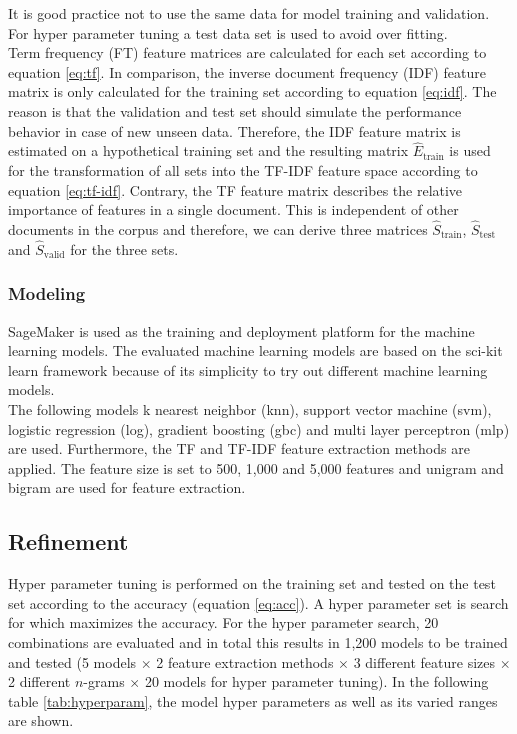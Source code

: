 \documentclass[a4paper,12pt,nottoc]{article}
\begin{document}
\noindent It is good practice not to use the same data for model training and validation. For hyper parameter tuning a test data set is used to avoid over fitting.\\

\noindent Term frequency (FT) feature matrices are calculated for each set according to equation \ref{eq:tf}. In comparison, the inverse document frequency (IDF) feature matrix is only calculated for the training set according to equation \ref{eq:idf}. The reason is that the validation and test set should simulate the performance behavior in case of new unseen data. Therefore, the IDF feature matrix is estimated on a hypothetical training set and the resulting matrix $\hat{E}_{\textrm{train}}$ is used for the transformation of all sets into the TF-IDF feature space according to equation \ref{eq:tf-idf}. Contrary, the TF feature matrix describes the relative importance of features in a single document. This is independent of other documents in the corpus and therefore, we can derive three matrices $\hat{S}_{\textrm{train}}$, $\hat{S}_{\textrm{test}}$ and $\hat{S}_{\textrm{valid}}$ for the three sets.

\subsubsection{Modeling}

\noindent SageMaker \cite{bib:sagemaker} is used as the training and deployment platform for the machine learning models. The evaluated machine learning models are based on the sci-kit learn framework \cite{bib:scikit-learn} because of its simplicity to try out different machine learning models.\\

\noindent The following models k nearest neighbor (knn), support vector machine (svm), logistic regression (log), gradient boosting (gbc) and multi layer perceptron (mlp) are used. Furthermore, the TF and TF-IDF feature extraction methods are applied. The feature size is set to 500, 1,000 and 5,000 features and unigram and bigram are used for feature extraction.

\subsection{Refinement}

Hyper parameter tuning is performed on the training set and tested on the test set according to the accuracy (equation \ref{eq:acc}). A hyper parameter set is search for which maximizes the accuracy. For the hyper parameter search, 20 combinations are evaluated and in total this results in 1,200 models to be trained and tested (5 models $\times$ 2 feature extraction methods $\times$  3 different feature sizes $\times$ 2 different $n$-grams $\times$ 20 models for hyper parameter tuning). In the following table \ref{tab:hyperparam}, the model hyper parameters as well as its varied ranges are shown. 
\end{document}

